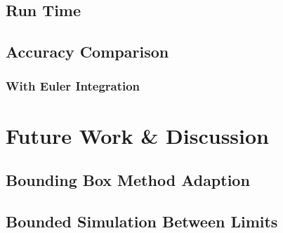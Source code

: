 	\subsection{Run Time}

	\subsection{Accuracy Comparison}

		\subsubsection{With Euler Integration}

\section{Future Work \& Discussion}

	\subsection{Bounding Box Method Adaption}

	\subsection{Bounded Simulation Between Limits}


